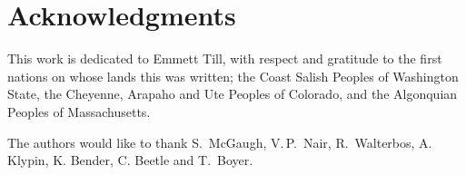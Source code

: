 \documentclass[reprint,%
 amsmath,amssymb,
 aps,
]{revtex4-1}
\begin{document}


   

  \section[]{Acknowledgments}
 This work is dedicated to Emmett Till, with respect and gratitude to the first nations 
 on whose lands this was written; 
  the Coast Salish Peoples of Washington State, 
 the Cheyenne,
 Arapaho and Ute  Peoples of Colorado, and the Algonquian Peoples of Massachusetts.  

  The authors would like to thank  S.\ McGaugh,  V.\,P.\,  Nair,   R.\, Walterbos,  A.\, Klypin, K. Bender, C. Beetle and     T.\, Boyer.   \\
  
 

\clearpage
\end{document}
